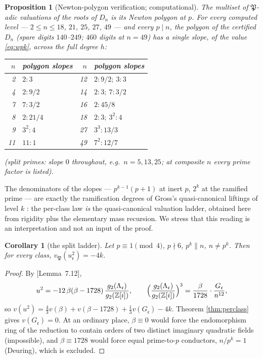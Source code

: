 \documentclass[11pt]{amsart}
\numberwithin{equation}{section}
\theoremstyle{plain}
\newtheorem{proposition}[theorem]{Proposition}
\newtheorem{corollary}[theorem]{Corollary}
\theoremstyle{definition}
\theoremstyle{remark}
\newcommand{\Z}{\mathbb{Z}}
\newcommand{\Zi}{\Z[i]}
\newcommand{\idealc}{\mathfrak{c}}
\newcommand{\idealP}{\mathfrak{P}}
\newcommand{\PaperI}{\cite{SchmidtI}}
\begin{document}
\begin{proposition}[Newton-polygon verification; computational]
\label{prop:newton}
The multiset of $\idealP$-adic valuations of the roots of $D_n$ is its
Newton polygon at $p$.  For every computed level --- $2 \le n \le 18$,
$21$, $25$, $27$, $49$ --- and every $p \mid n$, the polygon of the
certified $D_n$ (spare digits $140$--$249$; $460$ digits at $n = 49$) has a
\emph{single slope, of the value \eqref{eq:wpk}}, across the full degree
$h$:
\begin{center}
\small
\begin{tabular}{@{}rl@{\qquad}rl@{}}
\toprule
$n$ & polygon slopes & $n$ & polygon slopes\\
\midrule
2 & $2 : 3$ & 12 & $2 : 9/2;\ 3 : 3$\\
4 & $2 : 9/2$ & 14 & $2 : 3;\ 7 : 3/2$\\
7 & $7 : 3/2$ & 16 & $2 : 45/8$\\
8 & $2 : 21/4$ & 18 & $2 : 3;\ 3^2 : 4$\\
9 & $3^2 : 4$ & 27 & $3^3 : 13/3$\\
11 & $11 : 1$ & 49 & $7^2 : 12/7$\\
\bottomrule
\end{tabular}
\end{center}
(split primes: slope $0$ throughout, e.g.\ $n = 5, 13, 25$; at composite
$n$ every prime factor is listed).
\end{proposition}

The denominators of the slopes --- $p^{k-1}(p+1)$ at inert $p$, $2^k$ at
the ramified prime --- are exactly the ramification degrees of Gross's
quasi-canonical liftings of level $k$ \cite{Gross1986}: the per-class law
\emph{is} the quasi-canonical valuation ladder, obtained here from
rigidity plus the elementary mass recursion.  We stress that this reading
is an interpretation and not an input of the proof.

\begin{corollary}[the split ladder]\label{cor:split}
Let $p \equiv 1 \pmod 4$, $p \nmid 6$, $p^k \parallel n$, $n \ne p^k$.
Then for \emph{every} class, $v_\idealP(u_\idealc^2) = -4k$.
\end{corollary}

\begin{proof}
By \PaperI[Lemma~7.12],
\[
  u^2 = -12\,\beta(\beta - 1728)\,\frac{g_2(\Lambda_\idealc)}{g_2(\Zi)},
  \qquad
  \Bigl(\frac{g_2(\Lambda_\idealc)}{g_2(\Zi)}\Bigr)^{3}
  = \frac{\beta}{1728}\cdot\frac{G_\idealc}{n^{12}},
\]
so $v(u^2) = \tfrac43v(\beta) + v(\beta - 1728) + \tfrac13v(G_\idealc) -
4k$.  Theorem \ref{thm:perclass} gives $v(G_\idealc)
= 0$.  At an ordinary place, $\beta \equiv 0$ would force the
endomorphism ring of the reduction to contain orders of two distinct
imaginary quadratic fields (impossible), and $\beta \equiv 1728$ would
force equal prime-to-$p$ conductors, $n/p^k = 1$ (Deuring), which is
excluded.
\end{proof}
\end{document}
